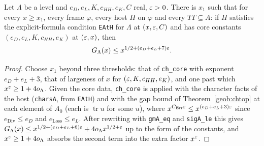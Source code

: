 \begin{theorem}\label{geob:coregm}
Let $\Lambda$ be a level and $e_D,e_L,K,c_{HH},e_K,C$ real, $\varepsilon>0$. There is
$x_1$ such that for every $x\ge x_1$, every frame $\varphi$, every host $H$ on
$\varphi$ and every $TT\subseteq A$: if $H$ satisfies the explicit-formula
condition \texttt{EAtH} for $\Lambda$ at $(x,\varepsilon,C)$ and has core constants
$(e_D,e_L,K,c_{HH},e_K)$ at $(\varepsilon,x)$, then
\[
G_{\Lambda}(x)\le x^{1/2+(e_D+e_L+7)\varepsilon}.
\]
\end{theorem}
\begin{proof}
Choose $x_1$ beyond three thresholds: that of \texttt{ch\_core} with exponent
$e_D+e_L+3$, that of largeness of $x$ for $(\varepsilon,K,c_{HH},e_K)$, and one past
which $x^{\varepsilon}\ge1+4o_{\Lambda}$. Given the core data, \texttt{ch\_core} is applied
with the character facts of the host (\texttt{charsA}, from \texttt{EAtH}) and
with the gap bound of Theorem~\ref{geob:chtop} at each element of $A_0$ (each is
$\operatorname{tr}u$ for some $u$), where
$x^{C_{\mathrm{Err}}\varepsilon}\le x^{(e_D+e_L+3)\varepsilon}$ since
$e_{\mathrm{Div}}\le e_D$ and $e_{\mathrm{Loss}}\le e_L$. After rewriting with
\texttt{gmA\_eq} and \texttt{sigA\_le} this gives
$G_{\Lambda}(x)\le x^{1/2+(e_D+e_L+6)\varepsilon}+4o_{\Lambda} x^{1/2+\varepsilon}$ up to the form
of the constants, and $x^{\varepsilon}\ge1+4o_{\Lambda}$ absorbs the second term into the
extra factor $x^{\varepsilon}$.
\end{proof}

